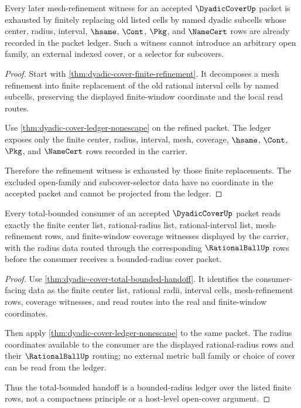 \begin{theorem}
\label{thm:dyadic-cover-refinement-witness-exhaustion}
Every later mesh-refinement witness for an accepted $\DyadicCoverUp$ packet is
exhausted by finitely replacing old listed cells by named dyadic subcells whose
center, radius, interval, $\hsame$, $\Cont$, $\Pkg$, and $\NameCert$ rows are
already recorded in the packet ledger. Such a witness cannot introduce an
arbitrary open family, an external indexed cover, or a selector for subcovers.
\end{theorem}
\begin{proof}
Start with \autoref{thm:dyadic-cover-finite-refinement}. It decomposes a mesh
refinement into finite replacement of the old rational interval cells by named
subcells, preserving the displayed finite-window coordinate and the local read
routes.

Use \autoref{thm:dyadic-cover-ledger-nonescape} on the refined packet. The
ledger exposes only the finite center, radius, interval, mesh, coverage,
$\hsame$, $\Cont$, $\Pkg$, and $\NameCert$ rows recorded in the carrier.

Therefore the refinement witness is exhausted by those finite replacements.
The excluded open-family and subcover-selector data have no coordinate in the
accepted packet and cannot be projected from the ledger.
\end{proof}

\begin{theorem}
\label{thm:dyadic-cover-total-bounded-radius-ledger}
Every total-bounded consumer of an accepted $\DyadicCoverUp$ packet reads
exactly the finite center list, rational-radius list, rational-interval list,
mesh-refinement rows, and finite-window coverage witnesses displayed by the
carrier, with the radius data routed through the corresponding
$\RationalBallUp$ rows before the consumer receives a bounded-radius cover
packet.
\end{theorem}
\begin{proof}
Use \autoref{thm:dyadic-cover-total-bounded-handoff}. It identifies the
consumer-facing data as the finite center list, rational radii, interval
cells, mesh-refinement rows, coverage witnesses, and read routes into the real
and finite-window coordinates.

Then apply \autoref{thm:dyadic-cover-ledger-nonescape} to the same packet. The
radius coordinates available to the consumer are the displayed rational-radius
rows and their $\RationalBallUp$ routing; no external metric ball family or
choice of cover can be read from the ledger.

Thus the total-bounded handoff is a bounded-radius ledger over the listed
finite rows, not a compactness principle or a host-level open-cover argument.
\end{proof}


